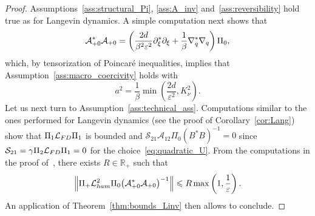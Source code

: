 \documentclass[10pt,a4paper]{article}
\numberwithin{equation}{section}
\newcommand{\cLs}{\mathcal{S}}
\newcommand{\cLa}{\mathcal{A}}
\newcommand{\R}{\mathbb{R}}
\newcommand{\cLham}{\mathcal{L}_{\rm ham}}
\newcommand{\cLFD}{\mathcal{L}_{\rm FD}}
\newcommand{\subplus}{\textnormal{\texttt{+}}}
\renewcommand{\leq}{\leqslant}
\begin{document}
\begin{proof}
Assumptions~\ref{ass:structural_Pi}, \ref{ass:A_inv} and~\ref{ass:reversibility} hold true as for Langevin dynamics. A simple computation next shows that
\[
\cLa_{\subplus 0}^*\cLa_{\subplus 0} = \left (\frac{2d}{\beta^2 \varepsilon^2} \partial_{\xi}^{*}\partial_{\xi} + \frac1\beta \nabla_{q}^{*}\nabla_{q} \right) \Pi_0,
\]
which, by tensorization of Poincaré inequalities, implies that Assumption~\ref{ass:macro_coercivity} holds with
\[
a^2 = \frac1\beta \min\left(\frac{2d}{\varepsilon^2},K_\nu^2\right).
\]
Let us next turn to Assumption~\ref{ass:technical_ass}. Computations similar to the ones performed for Langevin dynamics (see the proof of Corollary~\ref{cor:Lang}) show that $\Pi_1 \cLFD \Pi_1$ is bounded and $\cLs_{21} \cLa_{12} \Pi_0 (B^* B)^{-1} = 0$ since $\cLs_{21} = \gamma \Pi_2 \cLFD \Pi_1 = 0$ for the choice~\eqref{eq:quadratic_U}. From the computations in the proof of~\cite[Lemma~2.7]{LSS19}, there exists $R \in \R_+$ such that
\[
\left\| \Pi_\subplus\cLham^2 \Pi_0 \big(\cLa_{\subplus 0}^*\cLa_{\subplus 0}\big)^{-1} \right\| \leq R \max\left(1,\frac1\varepsilon\right).
\]
An application of Theorem~\ref{thm:bounds_Linv} then allows to conclude.
\end{proof}
\end{document}
